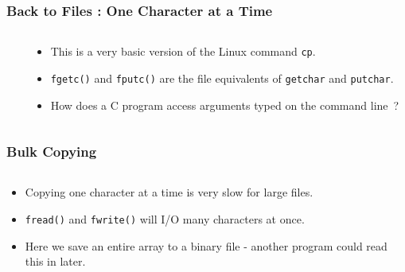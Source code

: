

\begin{frame}[fragile]
\frametitle{Back to Files : One Character at a Time}
\begin{columns}[T]

\begin{column}{0.50\textwidth}

\end{column}

\pause
\begin{column}{0.40\textwidth}
\begin{itemize}[<+->]
\item This is a very basic version of the Linux command \verb^cp^.
\item \verb^fgetc()^ and \verb^fputc()^ are the file equivalents of \verb^getchar^ and \verb^putchar^.
\item How does a C program access arguments typed on the command line~?
\end{itemize}
\end{column}


\end{columns}
\end{frame}



\begin{frame}[fragile]
\frametitle{Bulk Copying}
\begin{columns}[T]

\begin{column}{0.40\textwidth}
\begin{itemize}[<+->]
\item Copying one character at a time is very slow for large files.
\item \verb^fread()^ and \verb^fwrite()^ will I/O many characters at once.
\item Here we save an entire array to a binary file - another program could
read this in later.
\end{itemize}
\end{column}

\pause
\begin{column}{0.50\textwidth}

\end{column}


\end{columns}
\end{frame}

